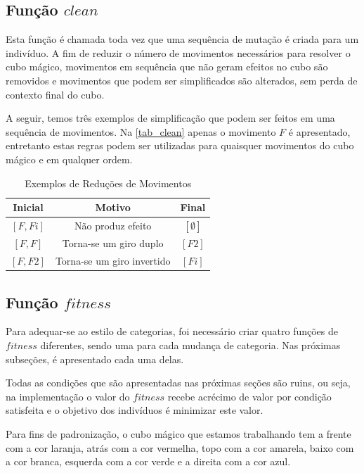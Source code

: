 \documentclass[12pt]{article}
\begin{document}
  \subsection{Função $clean$} \label{clean}
    Esta função é chamada toda vez que uma sequência de mutação é criada para um indivíduo. A fim de reduzir o número de movimentos necessários para resolver o cubo mágico, movimentos em sequência que não geram efeitos no cubo são removidos e movimentos que podem ser simplificados são alterados, sem perda de contexto final do cubo.
    
    A seguir, temos três exemplos de simplificação que podem ser feitos em uma sequência de movimentos. Na \autoref{tab_clean} apenas o movimento $F$ é apresentado, entretanto estas regras podem ser utilizadas para quaisquer movimentos do cubo mágico e em qualquer ordem.

    \begin{table}[ht]
      \centering
      \caption{Exemplos de Reduções de Movimentos} \label{tab_clean}
      \begin{tabular}{|c|c|c|}
        \hline
        \textbf{Inicial} & \textbf{Motivo}              & \textbf{Final}    \\ \hline
            $[F, Fi]$    &  Não produz efeito           &  $[\emptyset]$    \\ \hline
            $[F, F]$     &  Torna-se um giro duplo      &  $[F2]$           \\ \hline
            $[F, F2]$    &  Torna-se um giro invertido  &  $[Fi]$           \\ \hline
      \end{tabular}
    \end{table}

  \subsection{Função $fitness$} \label{fit}
    Para adequar-se ao estilo de categorias, foi necessário criar quatro funções de $fitness$ diferentes, sendo uma para cada mudança de categoria. Nas próximas subseções, é apresentado cada uma delas.

    Todas as condições que são apresentadas nas próximas seções são ruins, ou seja, na implementação o valor do $fitness$ recebe acrécimo de valor por condição satisfeita e o objetivo dos indivíduos é minimizar este valor.

    Para fins de padronização, o cubo mágico que estamos trabalhando tem a frente com a cor laranja, atrás com a cor vermelha, topo com a cor amarela, baixo com a cor branca, esquerda com a cor verde e a direita com a cor azul.
\end{document}
